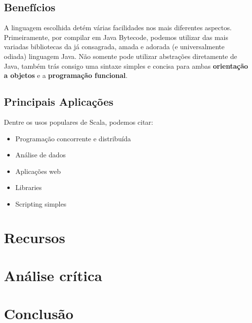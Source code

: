 \documentclass[rel_mlp]{iiufrgs}
\begin{document}
\section{Benefícios}

A linguagem escolhida detém várias facilidades nos mais diferentes aspectos.
Primeiramente, por compilar em Java Bytecode, podemos utilizar das mais variadas bibliotecas da já consagrada, amada e adorada (e universalmente odiada) linguagem Java.
Não somente pode utilizar abstrações diretamente de Java, também trás consigo uma sintaxe simples e concisa para ambas \textbf{orientação a objetos} e a \textbf{programação funcional}.

\section{Principais Aplicações}

Dentre os usos populares de Scala, podemos citar:

\begin{itemize}[leftmargin=3em]
\setlength{\itemindent}{1em}
    \item Programação concorrente e distribuída
    \item Análise de dados
    \item Aplicações web
    \item Libraries
    \item Scripting simples
\end{itemize}

\chapter{Recursos}\label{recursos} %


\chapter{Análise crítica}\label{analise} %


\chapter{Conclusão}\label{conclusao} %
\end{document}
